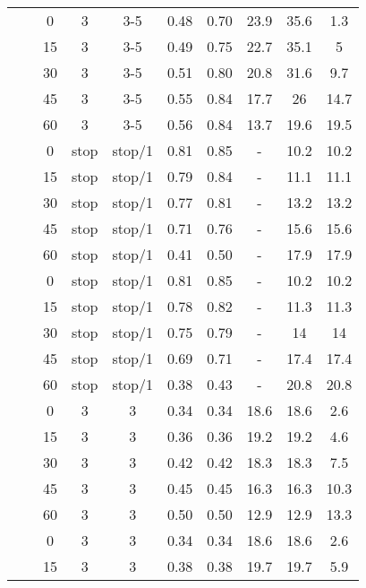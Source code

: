 \begin{longtable}[h!]{cccccccccc}
\nopagebreak
&  & 0 & 3 & 3-5 & 0.48 & 0.70 & 23.9 & 35.6 & 1.3\\
\nopagebreak
&  & 15 & 3 & 3-5 & 0.49 & 0.75 & 22.7 & 35.1 & 5\\
\nopagebreak
&  & 30 & 3 & 3-5 & 0.51 & 0.80 & 20.8 & 31.6 & 9.7\\
\nopagebreak
&  & 45 & 3 & 3-5 & 0.55 & 0.84 & 17.7 & 26 & 14.7\\
\nopagebreak
\multirow{-10}{*}{\centering\arraybackslash 7} & \multirow{-5}{*}{\centering\arraybackslash 0.33} & 60 & 3 & 3-5 & 0.56 & 0.84 & 13.7 & 19.6 & 19.5\\
\cmidrule{1-10}\pagebreak[0]
&  & 0 & stop & stop/1 & 0.81 & 0.85 & - & 10.2 & 10.2\\
\nopagebreak
&  & 15 & stop & stop/1 & 0.79 & 0.84 & - & 11.1 & 11.1\\
\nopagebreak
&  & 30 & stop & stop/1 & 0.77 & 0.81 & - & 13.2 & 13.2\\
\nopagebreak
&  & 45 & stop & stop/1 & 0.71 & 0.76 & - & 15.6 & 15.6\\
\nopagebreak
& \multirow{-5}{*}{\centering\arraybackslash 0.2} & 60 & stop & stop/1 & 0.41 & 0.50 & - & 17.9 & 17.9\\
\nopagebreak
&  & 0 & stop & stop/1 & 0.81 & 0.85 & - & 10.2 & 10.2\\
\nopagebreak
&  & 15 & stop & stop/1 & 0.78 & 0.82 & - & 11.3 & 11.3\\
\nopagebreak
&  & 30 & stop & stop/1 & 0.75 & 0.79 & - & 14 & 14\\
\nopagebreak
&  & 45 & stop & stop/1 & 0.69 & 0.71 & - & 17.4 & 17.4\\
\nopagebreak
\multirow{-10}{*}{\centering\arraybackslash 8} & \multirow{-5}{*}{\centering\arraybackslash 0.33} & 60 & stop & stop/1 & 0.38 & 0.43 & - & 20.8 & 20.8\\
\cmidrule{1-10}\pagebreak[0]
&  & 0 & 3 & 3 & 0.34 & 0.34 & 18.6 & 18.6 & 2.6\\
\nopagebreak
&  & 15 & 3 & 3 & 0.36 & 0.36 & 19.2 & 19.2 & 4.6\\
\nopagebreak
&  & 30 & 3 & 3 & 0.42 & 0.42 & 18.3 & 18.3 & 7.5\\
\nopagebreak
&  & 45 & 3 & 3 & 0.45 & 0.45 & 16.3 & 16.3 & 10.3\\
\nopagebreak
& \multirow{-5}{*}{\centering\arraybackslash 0.2} & 60 & 3 & 3 & 0.50 & 0.50 & 12.9 & 12.9 & 13.3\\
\nopagebreak
&  & 0 & 3 & 3 & 0.34 & 0.34 & 18.6 & 18.6 & 2.6\\
\nopagebreak
&  & 15 & 3 & 3 & 0.38 & 0.38 & 19.7 & 19.7 & 5.9\\

\end{longtable}
